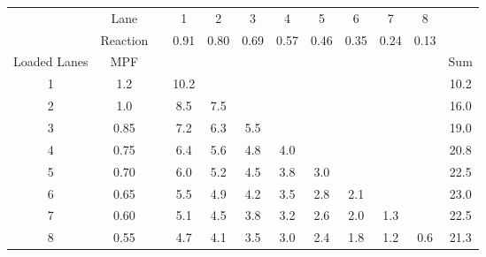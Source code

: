\begin{table}[H]
\begin{tabular}{cclccccccccc}
\cline{2-11}
             & Lane     &  & 1    & 2    & 3    & 4    & 5    & 6    & 7    & 8    &      \\
             & Reaction &  & 0.91 & 0.80 & 0.69 & 0.57 & 0.46 & 0.35 & 0.24 & 0.13 &      \\ \hline
Loaded Lanes & MPF      &  &      &      &      &      &      &      &      &      & Sum  \\ \hline
1            & 1.2      &  & 10.2 &      &      &      &      &      &      &      & 10.2 \\
2            & 1.0      &  & 8.5  & 7.5  &      &      &      &      &      &      & 16.0 \\
3            & 0.85     &  & 7.2  & 6.3  & 5.5  &      &      &      &      &      & 19.0 \\
4            & 0.75     &  & 6.4  & 5.6  & 4.8  & 4.0  &      &      &      &      & 20.8 \\
5            & 0.70     &  & 6.0  & 5.2  & 4.5  & 3.8  & 3.0  &      &      &      & 22.5 \\
6            & 0.65     &  & 5.5  & 4.9  & 4.2  & 3.5  & 2.8  & 2.1  &      &      & 23.0 \\
7            & 0.60     &  & 5.1  & 4.5  & 3.8  & 3.2  & 2.6  & 2.0  & 1.3  &      & 22.5 \\
8            & 0.55     &  & 4.7  & 4.1  & 3.5  & 3.0  & 2.4  & 1.8  & 1.2  & 0.6  & 21.3 \\ \hline
\end{tabular}
\end{table}